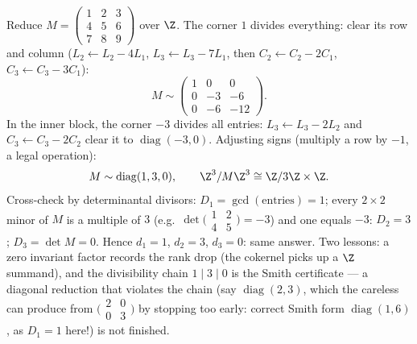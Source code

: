 \begin{example}
\label{ex:b3:modules:smithworked}
Reduce $M = \begin{pmatrix} 1 & 2 & 3\\ 4 & 5 & 6\\ 7 & 8 & 9
\end{pmatrix}$ over $\Z$. The corner $1$ divides everything:
clear its row and column ($L_2 \leftarrow L_2 - 4L_1$, $L_3
\leftarrow L_3 - 7L_1$, then $C_2 \leftarrow C_2 - 2C_1$, $C_3
\leftarrow C_3 - 3C_1$):
\[
M \sim \begin{pmatrix} 1 & 0 & 0\\ 0 & -3 & -6\\ 0 & -6 & -12
\end{pmatrix} .
\]
In the inner block, the corner $-3$ divides all entries: $L_3
\leftarrow L_3 - 2L_2$ and $C_3 \leftarrow C_3 - 2C_2$ clear it
to $\operatorname{diag}(-3, 0)$. Adjusting signs (multiply a
row by $-1$, a legal operation):
\[
M \sim \operatorname{diag}(1, 3, 0),
\qquad
\Z^3/M\Z^3 \cong \Z/3\Z \times \Z .
\]
Cross-check by determinantal divisors: $D_1 =
\gcd(\text{entries}) = 1$; every $2\times2$ minor of $M$ is a
multiple of $3$ (e.g.\ $\det\bigl(\begin{smallmatrix}1 & 2\\ 4
& 5\end{smallmatrix}\bigr) = -3$) and one equals $-3$: $D_2 =
3$; $D_3 = \det M = 0$. Hence $d_1 = 1$, $d_2 = 3$, $d_3 = 0$:
same answer. Two lessons: a zero invariant factor records the
rank drop (the cokernel picks up a  $\Z$ summand), and the
divisibility chain $1 \mid 3 \mid 0$ is the Smith certificate
--- a diagonal reduction that violates the chain (say
$\operatorname{diag}(2, 3)$, which the careless can produce
from $\bigl(\begin{smallmatrix}2 & 0\\ 0 &
3\end{smallmatrix}\bigr)$ by stopping too early: correct Smith
form $\operatorname{diag}(1, 6)$, as $D_1 = 1$ here!) is not
finished.
\end{example}

